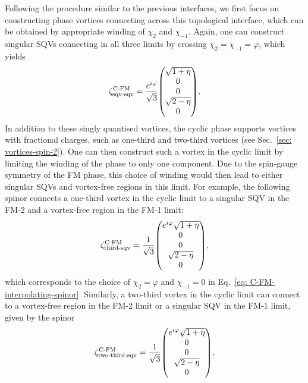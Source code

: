 Following the procedure similar to the previous interfaces, we first focus on
constructing phase vortices connecting across this topological interface, which
can be obtained by appropriate winding of \(\chi_2\) and \(\chi_{-1}\).
Again, one can construct singular SQVs connecting in all three limits by
crossing \(\chi_2 = \chi_{-1} = \varphi \), which yields
\begin{align}\label{eq: C-FM-sqv-sqv}
    \zeta^\text{C-FM}_\text{sqv-sqv} = \frac{e^{i\varphi}}{\sqrt{3}}\mqty(
        \sqrt{1 + \eta} \\
        0 \\
        0 \\
        \sqrt{2 - \eta} \\
        0
    ),
\end{align}
In addition to these singly quantised vortices, the cyclic phase supports
vortices with fractional charges, such as one-third and two-third vortices (see
Sec.~\ref{sec: vortices-spin-2}).
One can then construct such a vortex in the cyclic limit by limiting the winding
of the phase to only one component.
Due to the spin-gauge symmetry of the FM phase, this choice of winding would
then lead to either singular SQVs and vortex-free regions in this limit.
For example, the following spinor connects a one-third vortex in the cyclic
limit to a singular SQV in the FM-2 and a vortex-free region in the FM-1 limit:
\begin{align}\label{eq: C-FM-third-sqv}
    \zeta^\text{C-FM}_\text{third-sqv} = \frac{1}{\sqrt{3}}\mqty(
        e^{i\varphi}\sqrt{1 + \eta} \\
        0 \\
        0 \\
        \sqrt{2 - \eta} \\
        0
    ),
\end{align}
which corresponds to the choice of \(\chi_2 = \varphi \) and \(\chi_{-1} = 0\)
in Eq.~\eqref{eq: C-FM-interpolating-spinor}.
Similarly, a two-third vortex in the cyclic limit can connect to a vortex-free
region in the FM-2 limit or a singular SQV in the FM-1 limit, given by the
spinor
\begin{align}\label{eq: C-FM-2third-vf}
    \zeta^\text{C-FM}_\text{two-third-sqv} = \frac{1}{\sqrt{3}}\mqty(
        e^{i\varphi}\sqrt{1 + \eta} \\
        0 \\
        0 \\
        \sqrt{2 - \eta} \\
        0
    ),
\end{align}
